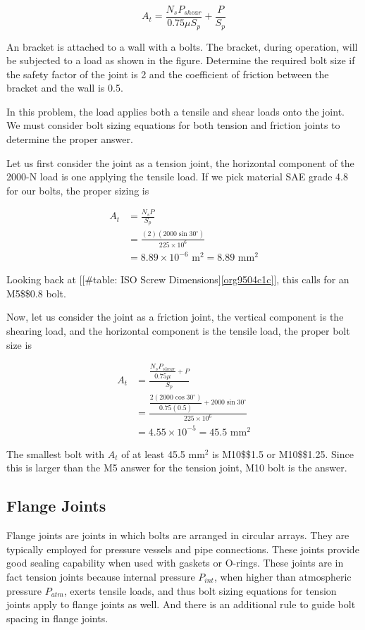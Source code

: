 \documentclass[a4paper,openany,12pt]{book}
\begin{document}
{{$$A_t = \frac{N_s P_{shear}}{0.75\mu S_p } + \frac{P}{S_p}$$

An bracket is attached to a wall with a bolts. The bracket, during
operation, will be subjected to a load as shown in the figure. Determine
the required bolt size if the safety factor of the joint is 2 and the
coefficient of friction between the bracket and the wall is 0.5.


In this problem, the load applies both a tensile and shear loads onto
the joint. We must consider bolt sizing equations for both tension and
friction joints to determine the proper answer.

Let us first consider the joint as a tension joint, the horizontal
component of the 2000-N load is one applying the tensile load. If we
pick material SAE grade 4.8 for our bolts, the proper sizing is

$$\begin{aligned}
    A_t &= \frac{N_s P}{S_p} \\
        &= \frac{(2)(2000 \sin 30^{\circ})}{225 \times 10^6} \\
        &= 8.89 \times 10^{-6} \text{ m}^2 = 8.89 \text{ mm}^2
  \end{aligned}$$

Looking back at
[[\#table: ISO Screw Dimensions]\ref{org9504c1c}], this
calls for an M5\$\texttimes{}\$0.8 bolt.

Now, let us consider the joint as a friction joint, the vertical
component is the shearing load, and the horizontal component is the
tensile load, the proper bolt size is

$$\begin{aligned}
    A_t &= \frac{\dfrac{N_s P_{shear}}{0.75\mu } + P}{S_p} \\
        &= \frac{\dfrac{2(2000 \cos 30^{\circ})}{0.75(0.5)} + 2000 \sin 30^{\circ}}{225 \times 10^6} \\
        &= 4.55 \times 10^{-5} = 45.5 \text{ mm}^2
  \end{aligned}$$

The smallest bolt with \(A_t\) of at least 45.5 mm\(^2\) is M10\$\texttimes{}\$1.5
or M10\$\texttimes{}\$1.25. Since this is larger than the M5 answer for the
tension joint, M10 bolt is the answer.

\subsection{Flange Joints}
\label{sec:org06062fd}
Flange joints are joints in which bolts are arranged in circular arrays.
They are typically employed for pressure vessels and pipe connections.
These joints provide good sealing capability when used with gaskets or
O-rings. These joints are in fact tension joints because internal
pressure \(P_{int}\), when higher than atmospheric pressure \(P_{atm}\),
exerts tensile loads, and thus bolt sizing equations for tension joints
apply to flange joints as well. And there is an additional rule to guide
bolt spacing in flange joints.


}}
\end{document}
